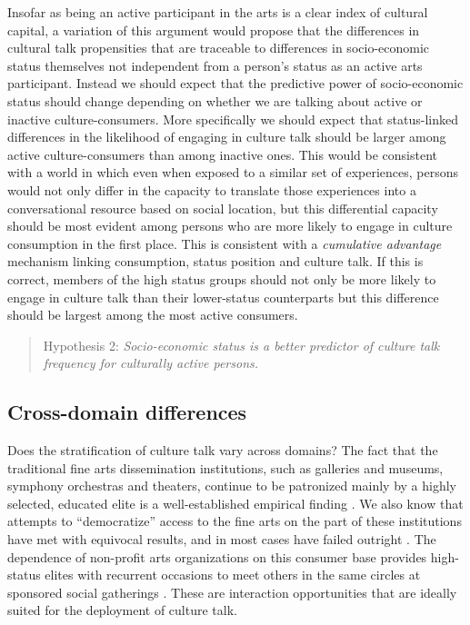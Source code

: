 Insofar as being an active participant in the arts is a clear index of cultural capital, a variation of this argument would propose that the differences in cultural talk propensities that are traceable to differences in socio-economic status themselves not independent from a person's status as an active arts participant. Instead we should expect that the predictive power of socio-economic status should change depending on whether we are talking about active or inactive culture-consumers. More specifically we should expect that status-linked differences in the likelihood of engaging in culture talk should be larger among active culture-consumers than among inactive ones.  This would be consistent with a world in which even when exposed to a similar set of experiences, persons would not only differ in the capacity to translate those experiences into a conversational resource based on social location, but this differential capacity should be most evident among persons who are more likely to engage in culture consumption in the first place.  This is consistent with a \emph{cumulative advantage} mechanism \citep{diprete_eirich06} linking consumption, status position and culture talk.  If this is correct, members of the high status groups should not only be more likely to engage in culture talk than their lower-status counterparts but this difference should be largest among the most active consumers.

\begin{quote}
Hypothesis 2:  \emph{Socio-economic status is a better predictor of culture talk frequency for culturally active persons.}
\end{quote}

\subsection{Cross-domain differences}
Does the stratification of culture talk vary across domains?  The fact that the traditional fine arts dissemination institutions, such as galleries and museums, symphony orchestras and theaters, continue to be patronized mainly by a highly selected, educated elite is a well-established empirical finding \citep{dimaggio_mukhtar04}.  We also know that attempts to ``democratize'' access to the fine arts on the part of these institutions have met with equivocal results, and in most cases have failed outright \citep{alexander96}.  The dependence of non-profit arts organizations on this consumer base provides high-status elites with recurrent occasions to meet others in the same circles at sponsored social gatherings \citep{ostrower98}.  These are interaction opportunities that are ideally suited for the deployment of culture talk.  

